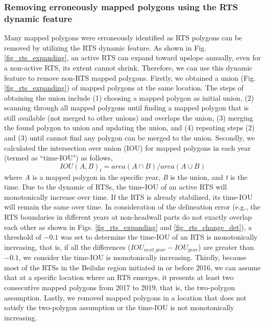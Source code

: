 \documentclass[authoryear,preprint,review,12pt]{elsarticle}
\begin{document}
\subsubsection{Removing erroneously mapped polygons using the RTS dynamic feature}
\label{sec_improving_using_rts_dynamic}


Many mapped polygons were erroneously identified as RTS polygons can be removed by utilizing the RTS dynamic feature. 
As shown in Fig. \ref{fig_rts_expanding}, an active RTS can expand toward upslope annually, even for a non-active RTS, its extent cannot shrink. 
Therefore, we can use this dynamic feature to remove non-RTS mapped polygons. 
Firstly, we obtained a union (Fig. \ref{fig_rts_expanding}) of mapped polygons at the same location.
The steps of obtaining the union include (1) choosing a mapped polygon as initial union, (2) scanning through all mapped polygons until finding a mapped polygon that is still available (not merged to other unions) and overlaps the union, (3) merging the found polygon to union and updating the union, and (4) repeating steps (2) and (3) until cannot find any polygon can be merged to the union. 
Secondly, we calculated the intersection over union (IOU) for mapped polygons in each year (termed as ``time-IOU") as follows, 
\begin{equation}
IOU(A,B)_{t}=area(A \cap B)/area(A \cup B)
\label{equ_time_iou}
\end{equation}
where \emph{A} is a mapped polygon in the specific year, \emph{B} is the union, and \emph{t} is the time. 
Due to the dynamic of RTSs, the time-IOU of an active RTS will monotonically increase over time. 
If the RTS is already stabilized, its time-IOU will remain the same over time. 
In consideration of the delineation error (e.g., the RTS boundaries in different years at non-headwall parts do not exactly overlap each other as shown in Figs. \ref{fig_rts_expanding} and \ref{fig_rts_change_det}), a threshold of $-0.1$ was set to determine the time-IOU of an RTS is monotonically increasing, that is, if all the differences ($IOU_{next\_year}-IOU_{year}$) are greater than $-0.1$, we consider the time-IOU is monotonically increasing. 
Thirdly, because most of the RTSs in the Beiluhe region initiated in or before 2016,
we can assume that at a specific location where an RTS emerges, it  presents at least two consecutive mapped polygons from 2017 to 2019, that is, the two-polygon assumption. 
Lastly, we removed mapped polygons in a location that does not satisfy the two-polygon assumption or the time-IOU is not monotonically increasing.
 
\end{document}
